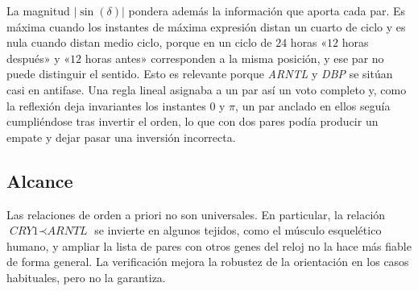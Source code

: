 \documentclass[12pt, a4paper]{report}
\begin{document}
La magnitud \(|\sin(\delta)|\) pondera además la información que aporta cada par. Es máxima cuando los instantes de máxima expresión distan un cuarto de ciclo y es nula cuando distan medio ciclo, porque en un ciclo de \(24\) horas «\(12\) horas después» y «\(12\) horas antes» corresponden a la misma posición, y ese par no puede distinguir el sentido. Esto es relevante porque \textit{ARNTL} y \textit{DBP} se sitúan casi en antifase. Una regla lineal asignaba a un par así un voto completo y, como la reflexión deja invariantes los instantes \(0\) y \(\pi\), un par anclado en ellos seguía cumpliéndose tras invertir el orden, lo que con dos pares podía producir un empate y dejar pasar una inversión incorrecta.

\subsection{Alcance}

Las relaciones de orden a priori no son universales. En particular, la relación \(\textit{CRY1}\prec\textit{ARNTL}\) se invierte en algunos tejidos, como el músculo esquelético humano, y ampliar la lista de pares con otros genes del reloj no la hace más fiable de forma general. La verificación mejora la robustez de la orientación en los casos habituales, pero no la garantiza.

\end{document}
